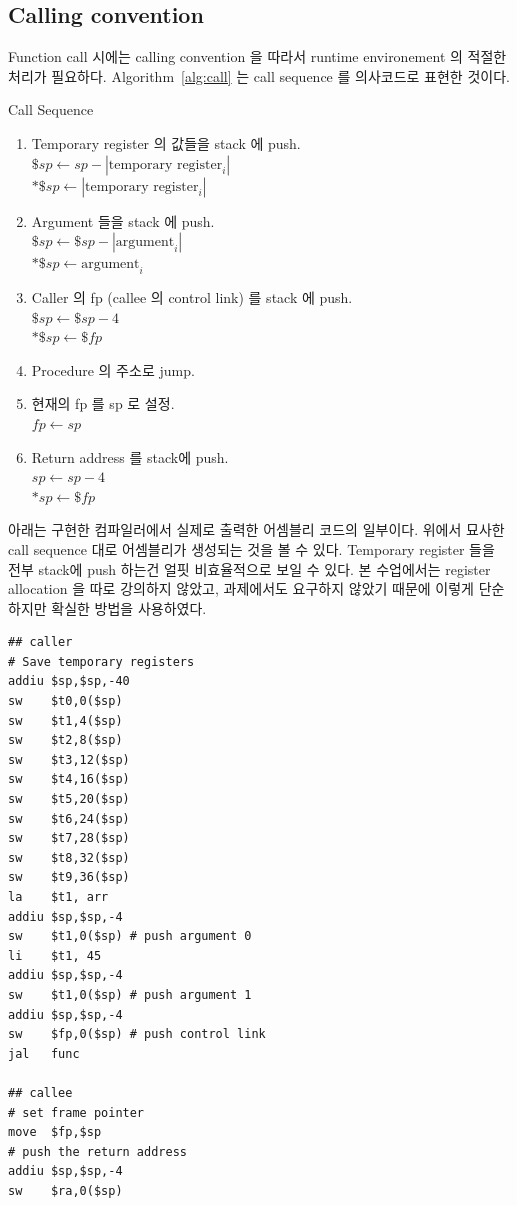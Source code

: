 \documentclass[a4paper,12p]{paper}
\begin{document}
\subsection{Calling convention}

Function call 시에는 calling convention 을 따라서 runtime environement 의 적절한 처리가 필요하다. Algorithm~\ref{alg:call} 는 call sequence 를 의사코드로 표현한 것이다.

\begin{algorithm}[H]
  \caption{Call Sequence}\label{alg:call}
  \begin{enumerate}
    \item Temporary register 의 값들을 stack 에 push. \\
      $\$sp    \leftarrow sp - |\text{temporary register}_i|$ \\
      $*\$sp   \leftarrow |\text{temporary register}_i|$
    \item Argument 들을 stack 에 push. \\
      $\$sp   \leftarrow \$sp - |\text{argument}_i|$ \\
      $*\$sp \leftarrow \text{argument}_i $
    \item Caller 의 fp (callee 의 control link) 를 stack 에 push.  \\
      $\$sp \leftarrow \$sp - 4$ \\
      $*\$sp \leftarrow \$fp $
    \item Procedure 의 주소로 jump.
    \item 현재의 fp 를 sp 로 설정. \\
      $fp \leftarrow sp$
    \item Return address 를 stack에 push.\\
      $sp  \leftarrow sp - 4$ \\
      $*sp \leftarrow \$fp $
  \end{enumerate}
\end{algorithm}

아래는 구현한 컴파일러에서 실제로 출력한 어셈블리 코드의 일부이다. 위에서 묘사한 call sequence 대로 어셈블리가 생성되는 것을 볼 수 있다. Temporary register 들을 전부 stack에 push 하는건 얼핏 비효율적으로 보일 수 있다. 본 수업에서는 register allocation 을 따로 강의하지 않았고, 과제에서도 요구하지 않았기 때문에 이렇게 단순하지만 확실한 방법을 사용하였다.

\begin{verbatim}
## caller
# Save temporary registers
addiu $sp,$sp,-40
sw    $t0,0($sp)
sw    $t1,4($sp)
sw    $t2,8($sp)
sw    $t3,12($sp)
sw    $t4,16($sp)
sw    $t5,20($sp)
sw    $t6,24($sp)
sw    $t7,28($sp)
sw    $t8,32($sp)
sw    $t9,36($sp)
la    $t1, arr
addiu $sp,$sp,-4
sw    $t1,0($sp) # push argument 0
li    $t1, 45
addiu $sp,$sp,-4
sw    $t1,0($sp) # push argument 1
addiu $sp,$sp,-4
sw    $fp,0($sp) # push control link
jal   func

## callee
# set frame pointer
move  $fp,$sp
# push the return address
addiu $sp,$sp,-4
sw    $ra,0($sp)
\end{verbatim}
\end{document}
